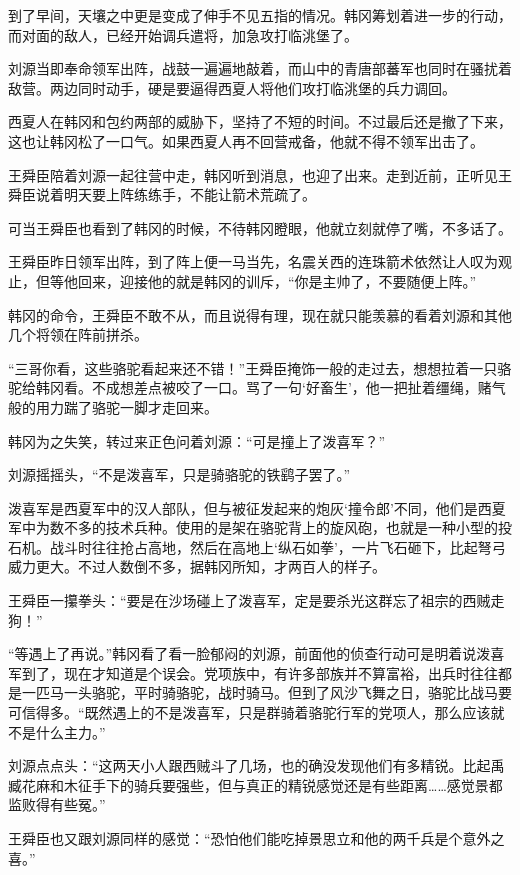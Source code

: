 到了早间，天壤之中更是变成了伸手不见五指的情况。韩冈筹划着进一步的行动，而对面的敌人，已经开始调兵遣将，加急攻打临洮堡了。

刘源当即奉命领军出阵，战鼓一遍遍地敲着，而山中的青唐部蕃军也同时在骚扰着敌营。两边同时动手，硬是要逼得西夏人将他们攻打临洮堡的兵力调回。

西夏人在韩冈和包约两部的威胁下，坚持了不短的时间。不过最后还是撤了下来，这也让韩冈松了一口气。如果西夏人再不回营戒备，他就不得不领军出击了。

王舜臣陪着刘源一起往营中走，韩冈听到消息，也迎了出来。走到近前，正听见王舜臣说着明天要上阵练练手，不能让箭术荒疏了。

可当王舜臣也看到了韩冈的时候，不待韩冈瞪眼，他就立刻就停了嘴，不多话了。

王舜臣昨日领军出阵，到了阵上便一马当先，名震关西的连珠箭术依然让人叹为观止，但等他回来，迎接他的就是韩冈的训斥，“你是主帅了，不要随便上阵。”

韩冈的命令，王舜臣不敢不从，而且说得有理，现在就只能羡慕的看着刘源和其他几个将领在阵前拼杀。

“三哥你看，这些骆驼看起来还不错！”王舜臣掩饰一般的走过去，想想拉着一只骆驼给韩冈看。不成想差点被咬了一口。骂了一句‘好畜生’，他一把扯着缰绳，赌气般的用力踹了骆驼一脚才走回来。

韩冈为之失笑，转过来正色问着刘源：“可是撞上了泼喜军？”

刘源摇摇头，“不是泼喜军，只是骑骆驼的铁鹞子罢了。”

泼喜军是西夏军中的汉人部队，但与被征发起来的炮灰‘撞令郎’不同，他们是西夏军中为数不多的技术兵种。使用的是架在骆驼背上的旋风砲，也就是一种小型的投石机。战斗时往往抢占高地，然后在高地上‘纵石如拳’，一片飞石砸下，比起弩弓威力更大。不过人数倒不多，据韩冈所知，才两百人的样子。

王舜臣一攥拳头：“要是在沙场碰上了泼喜军，定是要杀光这群忘了祖宗的西贼走狗！”

“等遇上了再说。”韩冈看了看一脸郁闷的刘源，前面他的侦查行动可是明着说泼喜军到了，现在才知道是个误会。党项族中，有许多部族并不算富裕，出兵时往往都是一匹马一头骆驼，平时骑骆驼，战时骑马。但到了风沙飞舞之日，骆驼比战马要可信得多。“既然遇上的不是泼喜军，只是群骑着骆驼行军的党项人，那么应该就不是什么主力。”

刘源点点头：“这两天小人跟西贼斗了几场，也的确没发现他们有多精锐。比起禹臧花麻和木征手下的骑兵要强些，但与真正的精锐感觉还是有些距离……感觉景都监败得有些冤。”

王舜臣也又跟刘源同样的感觉：“恐怕他们能吃掉景思立和他的两千兵是个意外之喜。”

